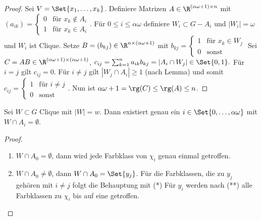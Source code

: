 \begin{st}[Lovász, 1972]
\begin{proof}
        Sei $V = \Set{x_1, \dotsc, x_k}$.
        Definiere Matrizen $A \in \R^{(\alpha \omega + 1) \times n}$ mit
        \begin{math}
            (a_{ik}) = \begin{cases}
                0 & \text{für $x_k \not\in A_i$} \\
                1 & \text{für $x_k \in A_i$}
            \end{cases}.
        \end{math}
        Für $0 \le i \le \alpha\omega$ definiere $W_i \subset G - A_i$ und $|W_i| = \omega$ und $W_i$ ist Clique. 
        Setze $B = (b_{kj}) \in \R^{n \times (\alpha\omega + 1)}$ mit
        \begin{math}
            b_{kj} = \begin{cases}
                1 & \text{für $x_k \in W_j$} \\
                0 & \text{sonst}
            \end{cases}
        \end{math}
        Sei $C = A B \in \R^{(\alpha\omega + 1) \times (\alpha\omega + 1)}$,
        \begin{math}
            c_{ij} = \sum_{k=1}^n a_{ik} b_{kj} = | A_i \cap W_j | \in \Set{0,1}.
        \end{math}
        Für $i = j$ gilt $c_{ij} = 0$.
        Für $i \neq j$ gilt $|W_j \cap A_i| \ge 1$ (nach Lemma) und somit
        \begin{math}
            c_{ij} = \begin{cases}
                1 & \text{für $i \neq j$} \\
                0 & \text{sonst}
            \end{cases}.
        \end{math}
        Nun ist $\alpha\omega + 1 = \rg(C) \le \rg(A) \le n$.
    \end{proof}
\end{st}

\begin{lem}
    Sei $W \subset G$ Clique mit $|W| = w$.
    Dann existiert genau ein $i \in \Set{0, \dotsc, \alpha \omega}$ mit $W \cap A_i = \emptyset$.
    \begin{proof}
        \begin{enumerate}[1)]
            \item
                $W \cap A_0 = \emptyset$, dann wird jede Farbklass von $\chi_i$ genau einmal getroffen.
            \item
                $W \cap A_0 \neq \emptyset$, dann $W \cap A_0 = \Set{y_j}$.
                Für die Farbklassen, die zu $y_j$ gehören mit $i \neq j$ folgt die Behauptung mit (*)
                Für $y_i$ werden nach (**) alle Farbklassen zu $\chi_i$ bis auf eine getroffen.
        \end{enumerate}
    \end{proof}
\end{lem}


